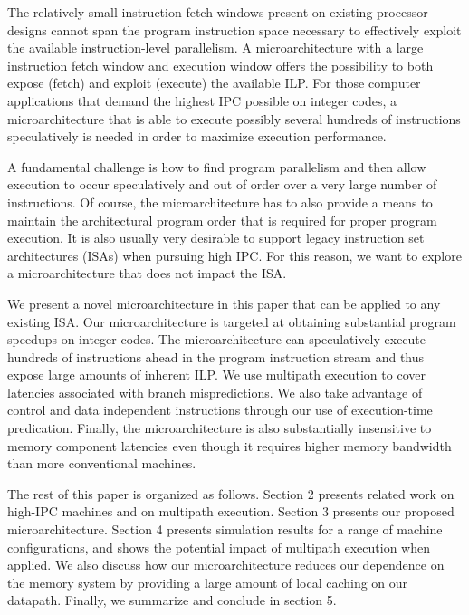 \documentclass[10pt,twocolumn,dvips]{article}
\begin{document}
The relatively small
instruction fetch windows present on existing processor designs cannot span
the program instruction space necessary to effectively exploit the
available instruction-level parallelism.  
A microarchitecture with a large instruction fetch window and
execution window offers the possibility to both expose (fetch) and
exploit (execute) the available ILP.
For those computer applications that demand the
highest IPC possible on integer codes, a microarchitecture
that is able to execute possibly
several hundreds of instructions speculatively is needed in order to 
maximize execution performance.  

A fundamental challenge 
is how to find program parallelism and then allow execution to occur
speculatively and out of order over a very large number of instructions.
Of course, the microarchitecture has to also provide a means
to maintain the architectural program order that
is required for proper program execution.
It is also usually very desirable to support legacy instruction
set architectures (ISAs) when pursuing high IPC. 
For this reason, we want to explore a
microarchitecture that does not impact the ISA.

We present a novel microarchitecture in this paper that can
be applied to any existing ISA.  Our microarchitecture
is targeted at obtaining
substantial program speedups on integer codes.
The microarchitecture can speculatively execute hundreds
of instructions ahead in the program instruction stream and
thus expose large amounts of inherent ILP.
We use multipath execution to cover latencies associated
with branch mispredictions.
We also take advantage of control
and data independent instructions through our use of
execution-time predication.
Finally, the microarchitecture is also substantially insensitive
to memory component latencies even though it requires higher
memory bandwidth than more conventional machines.

The rest of this paper is organized as follows.
Section 2 presents related work on
high-IPC machines and on multipath execution.
Section 3 presents our proposed microarchitecture.
Section 4 presents simulation results for a range of
machine configurations, and shows the potential
impact of multipath execution when applied.
We also discuss how our microarchitecture reduces
our dependence on the memory system by providing a large
amount of local caching on our datapath. 
Finally, we summarize and conclude in section 5.
%
\end{document}
